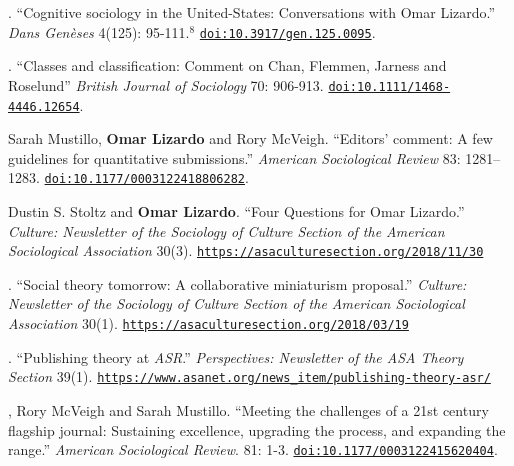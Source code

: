 
. ``Cognitive sociology in the United-States: Conversations with Omar Lizardo.'' {\em Dans Gen\`{e}ses} 4(125): 95-111.\textcolor{uclablue}{$^{8}$} \href{https://doi.org/10.3917/gen.125.0095}{\nolinkurl{doi:10.3917/gen.125.0095}}.

. ``Classes and classification: Comment on Chan, Flemmen, Jarness and Roselund'' {\em British Journal of Sociology} 70: 906-913. \href{https://doi.org/10.1111/1468-4446.12654}{\nolinkurl{doi:10.1111/1468-4446.12654}}.

\ind Sarah Mustillo, {\bf Omar Lizardo} and Rory McVeigh. ``Editors' comment: A few guidelines for quantitative submissions.'' {\em American Sociological Review} 83: 1281–1283. \href{https://doi.org/10.1177/0003122418806282}{\nolinkurl{doi:10.1177/0003122418806282}}.

\ind Dustin S. Stoltz and {\bf Omar Lizardo}. ``Four Questions for Omar Lizardo.'' \emph{Culture: Newsletter of the Sociology of Culture Section of the American Sociological Association}  30(3). \href{https://asaculturesection.org/2018/11/30/four-questions-for-omar-lizardo/}{\nolinkurl{https://asaculturesection.org/2018/11/30}}

. ``Social theory tomorrow: A collaborative miniaturism proposal.'' \emph{Culture: Newsletter of the Sociology of Culture Section of the American Sociological Association}  30(1). \href{https://asaculturesection.org/2018/03/19/symposium-on-social-theory-now-social-theory-tomorrow-a-collaborative-miniaturism-proposal/}{\nolinkurl{https://asaculturesection.org/2018/03/19}}

. ``Publishing theory at {\em ASR}.'' {\em Perspectives: Newsletter of the ASA Theory Section} 39(1). \newline \href{https://www.asanet.org/news_item/publishing-theory-asr/}{\nolinkurl{https://www.asanet.org/news_item/publishing-theory-asr/}}

, Rory McVeigh and Sarah Mustillo. ``Meeting the challenges of a 21st century flagship journal: Sustaining excellence, upgrading the process, and expanding the range.'' {\em American Sociological Review}. 81: 1-3. \href{https://doi.org/10.1177/0003122415620404}{\nolinkurl{doi:10.1177/0003122415620404}}.
